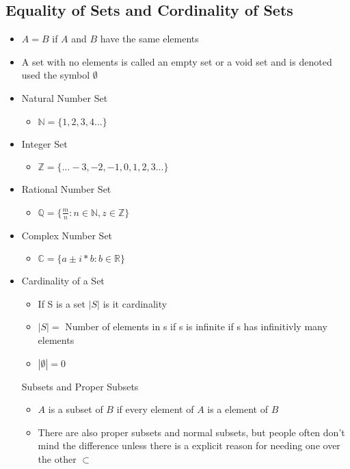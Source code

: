 \documentclass[12pt,a4paper]{article}
\begin{document}
\subsection{Equality of Sets and Cordinality of Sets}
\begin{itemize}
  \item \( A = B \) if \( A \) and \( B \) have the same elements 
  \item A set with no elements is called an empty set or a void set and is denoted used the symbol \( \emptyset \)
  \item Natural Number Set 
    \begin{itemize}
      \item \( \mathbb{N} = \{1, 2, 3, 4 \ldots \}\)
    \end{itemize}
  \item Integer Set 
    \begin{itemize}
      \item \( \mathbb{Z} = \{\ldots -3, -2, -1, 0, 1, 2, 3 \ldots \} \)
    \end{itemize}
  \item Rational Number Set 
    \begin{itemize}
      \item \( \mathbb{Q} = \{ \frac{m}{n}: n \in \mathbb{N}, z \in \mathbb{Z}\} \)
    \end{itemize}
  \item Complex Number Set 
    \begin{itemize}
      \item \( \mathbb{C} = \{a \pm i * b : b \in \mathbb{R}\} \)
    \end{itemize}

  \item Cardinality of a Set 
    \begin{itemize}
      \item If S is a set \( |S| \) is it cardinality 
      \item \( |S| = \) Number of elements in s if s is infinite if s has infinitivly many elements 
      \item \( |\emptyset | = 0 \)
    \end{itemize}
    Subsets and Proper Subsets 
    \begin{itemize}
      \item \( A \) is a subset of \( B \) if every element of \( A \) is a element of \( B \)
      \item There are also proper subsets and normal subsets, but people often don't mind the difference unless there is a explicit reason for needing one over the other \( \subset \)
    \end{itemize}
\end{itemize}
\end{document}
